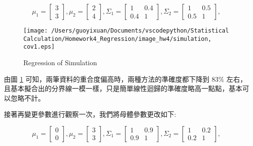 \begin{itemize}
$$ \mu_1 = \left[
            \begin{array}{clr}
                3  \\
                3 
            \end{array} \right] ,
            \mu_2 = \left[
            \begin{array}{clr}
                2  \\
                4 
            \end{array} \right] ,
            \Sigma_1 = \left[
            \begin{array}{clr}
                1 & 0.4  \\
                0.4 & 1
            \end{array} \right] ,
            \Sigma_2 = \left[
            \begin{array}{clr}
                1 & 0.5  \\
                0.5 & 1 
            \end{array} \right] ,$$ 

\begin{figure}[H]
    \centering
        \texttt{[image: /Users/guoyixuan/Documents/vscodepython/Statistical Calculation/Homework4\_Regression/image\_hw4/simulation, cov1.eps]}
    \caption{Regression of Simulation}
    \label{fig:Regression of cov1}
\end{figure}

由圖 \ref{fig:Regression of cov1} 可知，兩筆資料的重合度偏高時，兩種方法的準確度都下降到 $83\%$ 左右，且基本擬合出的分界線一模一樣，只是簡單線性迴歸的準確度略高一點點，基本可以忽略不計。

接著再變更參數進行觀察一次，我們將母體參數更改如下:

$$ \mu_1 = \left[
            \begin{array}{clr}
                0  \\
                0 
            \end{array} \right] ,
            \mu_2 = \left[
            \begin{array}{clr}
                3  \\
                3 
            \end{array} \right] ,
            \Sigma_1 = \left[
            \begin{array}{clr}
                1 & 0.9  \\
                0.9 & 1
            \end{array} \right] ,
            \Sigma_2 = \left[
            \begin{array}{clr}
                1 & 0.2  \\
                0.2 & 1 
            \end{array} \right] ,$$ 


\end{itemize}
